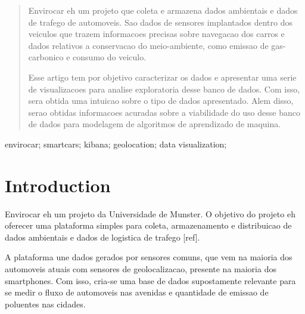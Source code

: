 \documentclass[10pt, conference]{IEEEtran}
\begin{document}
\maketitle


\begin{abstract}
Envirocar eh um projeto que coleta e armazena dados ambientais e dados de trafego
de automoveis. 
Sao dados de sensores implantados dentro dos veiculos que trazem informacoes
precisas sobre navegacao dos carros e dados relativos a conservacao do meio-ambiente, 
como emissao de gas-carbonico e consumo do veiculo. 

Esse artigo tem por objetivo caracterizar os dados e apresentar uma serie de 
visualizacoes para analise exploratoria desse banco de dados. Com isso, sera
obtida uma intuicao sobre o tipo de dados apresentado. Alem disso, serao obtidas
informacoes acuradas sobre a viabilidade do uso desse banco de dados para modelagem
de algoritmos de aprendizado de maquina.

%
\end{abstract}

\begin{IEEEkeywords}
envirocar; smartcars; kibana; geolocation; data visualization;

\end{IEEEkeywords}


\IEEEpeerreviewmaketitle





\section{Introduction}
Envirocar eh um projeto da Universidade de Munster. O objetivo 
do projeto eh oferecer uma plataforma simples para coleta, 
armazenamento e distribuicao de dados ambientais e dados de logistica
de trafego [ref]. 

A plataforma une dados gerados por sensores comuns,
que vem na maioria dos automoveis atuais com sensores de 
geolocalizacao, presente na maioria dos smartphones. Com isso,
cria-se uma base de dados supostamente relevante para se medir o fluxo de automoveis
nas avenidas e quantidade de emissao de poluentes nas cidades. 
\end{document}
